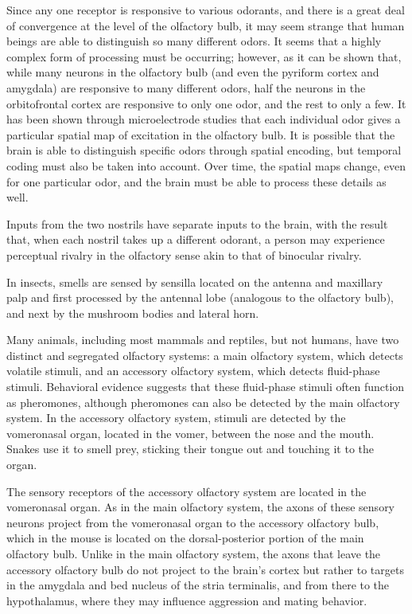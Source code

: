 Since any one receptor is responsive to various odorants, and there is a great deal of convergence at the level of the olfactory bulb, it may seem strange that human beings are able to distinguish so many different odors. It seems that a highly complex form of processing must be occurring; however, as it can be shown that, while many neurons in the olfactory bulb (and even the pyriform cortex and amygdala) are responsive to many different odors, half the neurons in the orbitofrontal cortex are responsive to only one odor, and the rest to only a few. It has been shown through microelectrode studies that each individual odor gives a particular spatial map of excitation in the olfactory bulb. It is possible that the brain is able to distinguish specific odors through spatial encoding, but temporal coding must also be taken into account. Over time, the spatial maps change, even for one particular odor, and the brain must be able to process these details as well.

Inputs from the two nostrils have separate inputs to the brain, with the result that, when each nostril takes up a different odorant, a person may experience perceptual rivalry in the olfactory sense akin to that of binocular rivalry.

In insects, smells are sensed by sensilla located on the antenna and maxillary palp and first processed by the antennal lobe (analogous to the olfactory bulb), and next by the mushroom bodies and lateral horn.

Many animals, including most mammals and reptiles, but not humans, have two distinct and segregated olfactory systems: a main olfactory system, which detects volatile stimuli, and an accessory olfactory system, which detects fluid-phase stimuli. Behavioral evidence suggests that these fluid-phase stimuli often function as pheromones, although pheromones can also be detected by the main olfactory system. In the accessory olfactory system, stimuli are detected by the vomeronasal organ, located in the vomer, between the nose and the mouth. Snakes use it to smell prey, sticking their tongue out and touching it to the organ.

The sensory receptors of the accessory olfactory system are located in the vomeronasal organ. As in the main olfactory system, the axons of these sensory neurons project from the vomeronasal organ to the accessory olfactory bulb, which in the mouse is located on the dorsal-posterior portion of the main olfactory bulb. Unlike in the main olfactory system, the axons that leave the accessory olfactory bulb do not project to the brain's cortex but rather to targets in the amygdala and bed nucleus of the stria terminalis, and from there to the hypothalamus, where they may influence aggression and mating behavior.

